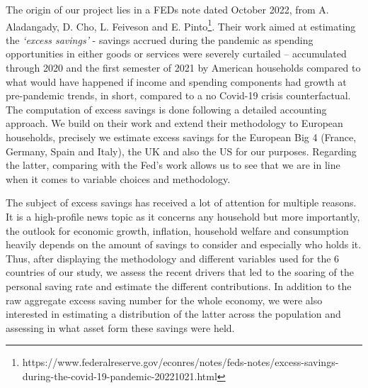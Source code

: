 \quad The origin of our project lies in a FEDs note dated October 2022, from A. Aladangady, D. Cho, L. Feiveson and E. Pinto\footnote{https://www.federalreserve.gov/econres/notes/feds-notes/excess-savings-during-the-covid-19-pandemic-20221021.html}. Their work aimed at estimating the \textit{‘excess savings’} - savings accrued during the pandemic as spending opportunities in either goods or services were severely curtailed – accumulated through 2020 and the first semester of 2021 by American households compared to what would have happened if income and spending components had growth at pre-pandemic trends, in short, compared to a no Covid-19 crisis counterfactual. The computation of excess savings is done following a detailed accounting approach. We build on their work and extend their methodology to European households, precisely we estimate excess savings for the European Big 4 (France, Germany, Spain and Italy), the UK and also the US for our purposes. Regarding the latter, comparing with the Fed’s work allows us to see that we are in line when it comes to variable choices and methodology.\par
The subject of excess savings has received a lot of attention for multiple reasons. It is a high-profile news topic as it concerns any household but more importantly, the outlook for economic growth, inflation, household welfare and consumption heavily depends on the amount of savings to consider and especially who holds it. Thus, after displaying the methodology and different variables used for the 6 countries of our study, we assess the recent drivers that led to the soaring of the personal saving rate and estimate the different contributions. In addition to the raw aggregate excess saving number for the whole economy, we were also interested in estimating a distribution of the latter across the population and assessing in what asset form these savings were held.

